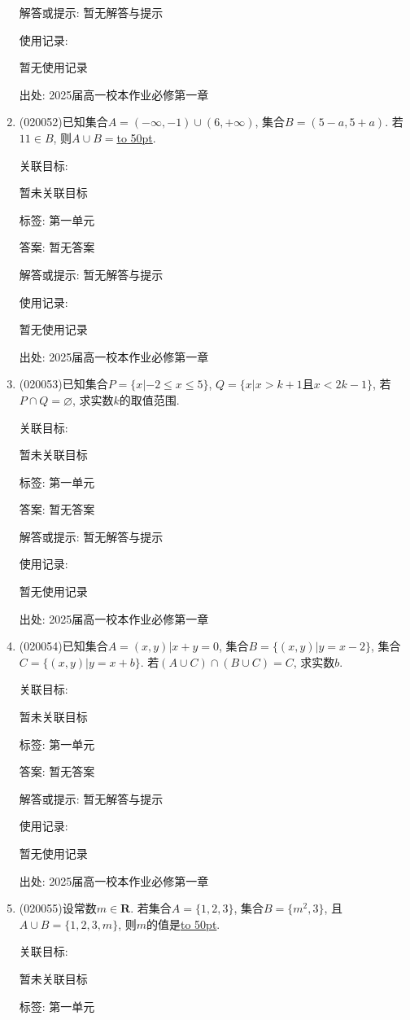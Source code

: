 \documentclass[10pt,a4paper]{article}
\newcommand{\blank}[1]{\underline{\hbox to #1pt{}}}
\begin{document}
\begin{enumerate}[1.]
解答或提示: 暂无解答与提示

使用记录:

暂无使用记录


出处: 2025届高一校本作业必修第一章
\item { (020052)}已知集合$A=(-\infty, -1)\cup(6, +\infty)$, 集合$B=(5-a, 5+a)$. 若$11\in B$, 则$A\cup B=$\blank{50}.


关联目标:

暂未关联目标



标签: 第一单元

答案: 暂无答案

解答或提示: 暂无解答与提示

使用记录:

暂无使用记录


出处: 2025届高一校本作业必修第一章
\item { (020053)}已知集合$P=\{ x|-2\le x\le 5\}$, $Q=\{x|x>k+1$且$x<2k-1\}$, 若$P\cap Q=\varnothing$, 求实数$k$的取值范围.


关联目标:

暂未关联目标



标签: 第一单元

答案: 暂无答案

解答或提示: 暂无解答与提示

使用记录:

暂无使用记录


出处: 2025届高一校本作业必修第一章
\item { (020054)}已知集合$A={(x, y)|x+y=0}$, 集合$B=\{(x,y)|y=x-2\}$, 集合$C=\{(x,y)|y=x+b\}$. 若$(A\cup C)\cap(B\cup C)=C$, 求实数$b$.


关联目标:

暂未关联目标



标签: 第一单元

答案: 暂无答案

解答或提示: 暂无解答与提示

使用记录:

暂无使用记录


出处: 2025届高一校本作业必修第一章
\item { (020055)}设常数$m\in \mathbf{R}$. 若集合$A=\{1,2,3\}$, 集合$B=\{m^2,3\}$, 且$A\cup B=\{1,2,3,m\}$, 则$m$的值是\blank{50}.


关联目标:

暂未关联目标



标签: 第一单元


\end{enumerate}
\end{document}
